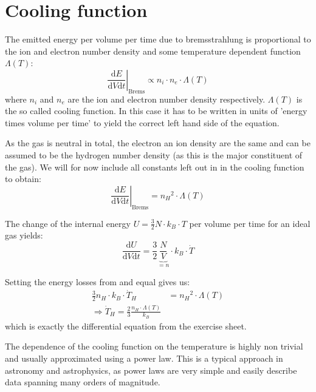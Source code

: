 \documentclass[a4paper,10pt,openany]{article}
\begin{document}
\section{Cooling function}

The emitted energy per volume per time due to bremsstrahlung is proportional to the ion and electron number density and some temperature dependent function $\Lambda(T)$:
\begin{equation}\label{eq:bremsstralung energy loss}
\left.\frac{\text{d}E}{\text{d}V\text{d}t}\right|_\text{Brems} \propto n_i \cdot n_e \cdot \Lambda(T)
\end{equation}
where $n_i$ and $n_e$ are the ion and electron number density respectively. $\Lambda(T)$ is the so called cooling function. In this case it has to be written in units of 'energy times volume per time' to yield the correct left hand side of the equation.

As the gas is neutral in total, the electron an ion density are the same and can be assumed to be the hydrogen number density (as this is the major constituent of the gas). We will for now include all constants left out in  in the cooling function to obtain:
\begin{equation}\label{eq:bremsstralung energy loss2}
\left.\frac{\text{d}E}{\text{d}V\text{d}t}\right|_\text{Brems} = n_H{ }^2 \cdot \Lambda(T)
\end{equation}


The change of the internal energy $U = \tfrac{3}{2} N \cdot k_B \cdot T$ per volume per time for an ideal gas yields:
\begin{equation}\label{eq:internal energy loss}
\frac{\text{d}U}{\text{d}V\text{d}t} = \frac{3}{2} \underbrace{\frac{N}{V}}_{=n} \cdot k_B \cdot \dot{T}
\end{equation}

Setting the energy losses from  and  equal gives us:
\begin{equation}
\begin{aligned}
\frac{3}{2} n_H \cdot k_B \cdot \dot{T}_H &=  n_H{ }^2 \cdot \Lambda(T)\\
\Rightarrow \dot{T}_H = \frac{2}{3} \frac{ n_H \cdot \Lambda(T) }{k_B}
\end{aligned}
\end{equation}
which is exactly the differential equation from the exercise sheet.

The dependence of the cooling function on the temperature is highly non trivial and usually approximated using a power law. This is a typical approach in astronomy and astrophysics, as power laws are very simple and easily describe data spanning many orders of magnitude.
\end{document}
